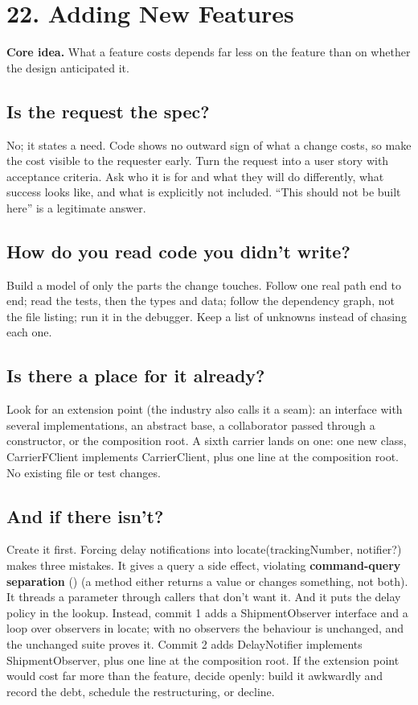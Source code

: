 \documentclass[10pt]{article}
\newcommand{\code}[1]{{\ttfamily\small #1}}
\newcommand{\term}[3][]{%
  \hypertarget{t:#2}{\textbf{#3}}%
  \if\relax\detokenize{#1}\relax\else%
    {\thinspace\footnotesize\color{black!65}(#1)}%
  \fi%
}
\newcommand{\chap}[2]{\section*{#1}\addcontentsline{toc}{section}{#1}\vspace{-2pt}\begin{corebox}\textbf{Core idea.} #2\end{corebox}}
\begin{document}
\chap{22. Adding New Features}{What a feature costs depends far less on the feature than on whether the design anticipated it.}

\subsection{Is the request the spec?}
No; it states a need. Code shows no outward sign of what a change costs, so make the cost visible to the requester early. Turn the request into a user story with acceptance criteria. Ask who it is for and what they will do differently, what success looks like, and what is explicitly not included. ``This should not be built here'' is a legitimate answer.

\subsection{How do you read code you didn't write?}
Build a model of only the parts the change touches. Follow one real path end to end; read the tests, then the types and data; follow the dependency graph, not the file listing; run it in the debugger. Keep a list of unknowns instead of chasing each one.

\subsection{Is there a place for it already?}
Look for an extension point (the industry also calls it a seam): an interface with several implementations, an abstract base, a collaborator passed through a constructor, or the composition root. A sixth carrier lands on one: one new class, \code{CarrierFClient implements CarrierClient}, plus one line at the composition root. No existing file or test changes.

\subsection{And if there isn't?}
Create it first. Forcing delay notifications into \code{locate(trackingNumber, notifier?)} makes three mistakes. It gives a query a side effect, violating \term{cqs}{command-query separation} (a method either returns a value or changes something, not both). It threads a parameter through callers that don't want it. And it puts the delay policy in the lookup. Instead, commit 1 adds a \code{ShipmentObserver} interface and a loop over observers in \code{locate}; with no observers the behaviour is unchanged, and the unchanged suite proves it. Commit 2 adds \code{DelayNotifier implements ShipmentObserver}, plus one line at the composition root. If the extension point would cost far more than the feature, decide openly: build it awkwardly and record the debt, schedule the restructuring, or decline.
\end{document}
